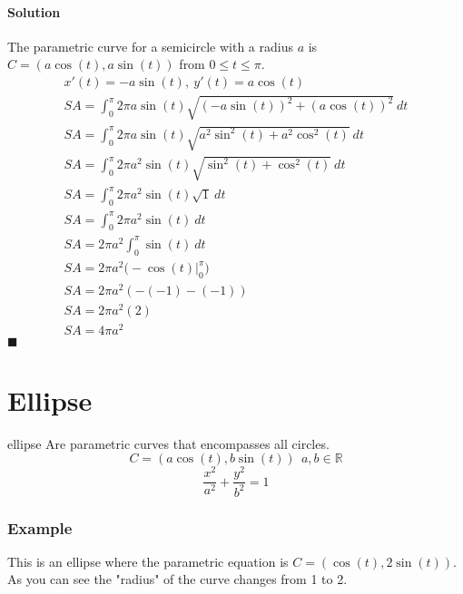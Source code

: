 \documentclass[./MATH-115-Notes.tex]{subfiles}
\begin{document}
\paragraph{Solution}
The parametric curve for a semicircle with a radius $a$ is $ C = (a\cos(t), a\sin(t)) $ from $0 \le t \le \pi $.
\begin{gather*}
    x'(t) = -a\sin(t),\ y'(t) = a\cos(t)\\
    SA = \int_0^\pi 2\pi a\sin(t)\sqrt{(-a\sin(t))^2+(a\cos(t))^2}\ dt \\
    SA = \int_0^\pi 2\pi a\sin(t)\sqrt{a^2\sin^2(t)+a^2\cos^2(t)}\ dt \\
    SA = \int_0^\pi 2\pi a^2\sin(t)\sqrt{\sin^2(t)+\cos^2(t)}\ dt \\
    SA = \int_0^\pi 2\pi a^2\sin(t)\sqrt{1}\ dt \\
    SA = \int_0^\pi 2\pi a^2\sin(t)\ dt \\
    SA = 2\pi a^2 \int_0^\pi \sin(t)\ dt\\
    SA = 2\pi a^2 \biggl(-\cos(t)\biggl|_0^\pi\biggl)\\
    SA = 2\pi a^2 (-(-1) - (-1))\\
    SA = 2\pi a^2 (2)\\
    SA = 4\pi a^2
\end{gather*}
\hfill\ensuremath{\blacksquare}
\newpage

\section{Ellipse}
\begin{paperbox}{ellipse}
    Are parametric curves that encompasses all circles.
    \begin{equation}
        C = (a \cos(t), b \sin(t))\ \ a,b \in \mathbb{R}
    \end{equation}
    \begin{equation}
        \frac{x^2}{a^2} + \frac{y^2}{b^2} = 1
    \end{equation}
\end{paperbox}
\subsubsection{Example}
This is an ellipse where the parametric equation is $C = (\cos(t), 2\sin(t))$. As you can see the "radius" of the curve changes from 1 to 2.
\end{document}
